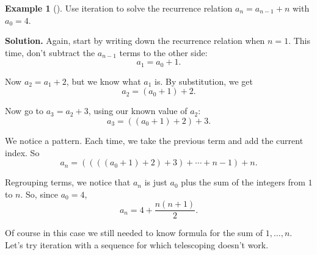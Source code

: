 \documentclass[10pt,]{book}
\theoremstyle{plain}
\theoremstyle{definition}
\theoremstyle{definition}
\newtheorem{example}[theorem]{Example}
\theoremstyle{definition}
\theoremstyle{definition}
\numberwithin{equation}{chapter}
\begin{document}
\begin{example}[]\label{example-21}
\hypertarget{p-312}{}%
Use iteration to solve the recurrence relation \(a_n = a_{n-1} + n\) with \(a_0 = 4\).%
\par\smallskip%
\noindent\textbf{Solution.}\hypertarget{solution-35}{}\quad%
\hypertarget{p-313}{}%
Again, start by writing down the recurrence relation when \(n = 1\). This time, don't subtract the \(a_{n-1}\) terms to the other side:%
\begin{equation*}
a_1 = a_0 + 1.
\end{equation*}
%
\par
\hypertarget{p-314}{}%
Now \(a_2 = a_1 + 2\), but we know what \(a_1\) is. By substitution, we get%
\begin{equation*}
a_2 = (a_0 + 1) + 2.
\end{equation*}
%
\par
\hypertarget{p-315}{}%
Now go to \(a_3 = a_2 + 3\), using our known value of \(a_2\):%
\begin{equation*}
a_3 = ((a_0 + 1) + 2) + 3.
\end{equation*}
%
\par
\hypertarget{p-316}{}%
We notice a pattern. Each time, we take the previous term and add the current index. So%
\begin{equation*}
a_n = ((((a_0 + 1) +2)+3)+\cdots + n-1) + n.
\end{equation*}
%
\par
\hypertarget{p-317}{}%
Regrouping terms, we notice that \(a_n\) is just \(a_0\) plus the sum of the integers from \(1\) to \(n\). So, since \(a_0 = 4\),%
\begin{equation*}
a_n = 4 + \frac{n(n+1)}{2}.
\end{equation*}
%
\end{example}
\hypertarget{p-318}{}%
Of course in this case we still needed to know formula for the sum of \(1,\ldots,n\). Let's try iteration with a sequence for which telescoping doesn't work.%
\end{document}
